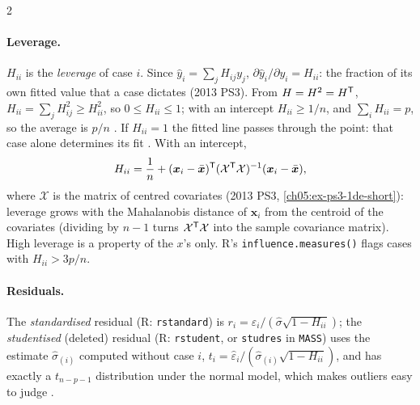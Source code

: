 \begin{paracol}{2}
\paragraph{Leverage.} $H_{ii}$ is the \emph{leverage} of case $i$. Since $\hat y_i=\sum_jH_{ij}y_j$, $\partial\hat y_i/\partial y_i=H_{ii}$: the
fraction of its own fitted value that a case dictates (2013 PS3). From $H=H^2=H^{\mathsf T}$,
$H_{ii}=\sum_jH_{ij}^2\ge H_{ii}^2$, so $0\le H_{ii}\le1$; with an intercept $H_{ii}\ge1/n$, and $\sum_iH_{ii}=p$, so the average is
$p/n$ . If $H_{ii}=1$ the fitted line passes through the point: that case alone determines its
fit . With an intercept,
\[
  H_{ii}=\frac1n+(\bm x_i-\bar{\bm x})^{\mathsf T}(\mathcal X^{\mathsf T}\mathcal X)^{-1}(\bm x_i-\bar{\bm x}),
\]
where $\mathcal X$ is the matrix of centred covariates (2013 PS3, \cref{ch05:ex-ps3-1de-short}): leverage grows with the
Mahalanobis distance of $\bm x_i$ from the centroid of the covariates (dividing by $n-1$ turns $\mathcal X^{\mathsf T}\mathcal X$ into the sample
covariance matrix). High leverage is a property of the $x$'s only. R's \texttt{influence.measures()} flags cases with
$H_{ii}>3p/n$.

\paragraph{Residuals.} The \emph{standardised} residual (R: \texttt{rstandard}) is
$r_i=\hat\varepsilon_i/(\hat\sigma\sqrt{1-H_{ii}})$; the \emph{studentised} (deleted) residual (R: \texttt{rstudent}, or
\texttt{studres} in \texttt{MASS}) uses the estimate $\hat\sigma_{(i)}$ computed without case $i$,
$t_i=\hat\varepsilon_i/(\hat\sigma_{(i)}\sqrt{1-H_{ii}})$, and has exactly a $t_{n-p-1}$ distribution under the normal model, which makes
outliers easy to judge .


\end{paracol}
